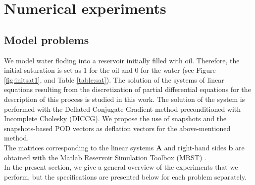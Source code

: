 \documentclass[12pt]{article}
\begin{document}

\newpage
\section{Numerical experiments}\label{numexp}
\subsection{Model problems}\label{modpro}
\hspace{0.5cm} We model water floding into a reservoir initially filled with oil. Therefore, the initial saturation is set as 1 for the oil and 0 for the water (see Figure \ref{fig:initsat1}, and Table \ref{table:sat}). 
The solution of the systems of linear equations resulting from the discretization of partial differential equations for the description of this process is studied in this work. 
The solution of the system is performed with the Deflated Conjugate Gradient method preconditioned with Incomplete Cholesky (DICCG).
We propose the use of snapshots and the snapshots-based POD vectors as deflation vectors for the above-mentioned method.\\The matrices corresponding to the linear systems $\mathbf{A}$ and right-hand sides $\mathbf{b}$ are obtained with the Matlab Reservoir Simulation Toolbox (MRST) \cite{Lie13}.
\\
In the present section, we give a general overview of the experiments that we perform, but the specifications are presented below for each problem separately. 
\end{document}
